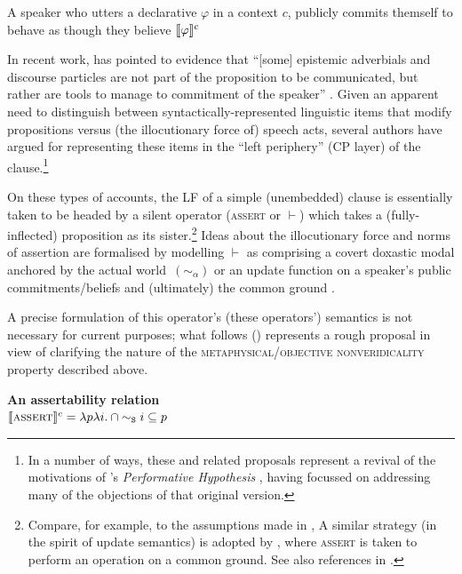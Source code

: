A speaker who utters a declarative $ \varphi $ in a context $ c $, publicly commits themself to behave as though they believe $ \denote[c]{\varphi} $ 
\xe





In recent work, \citeauthor{Krifka2019} has pointed to evidence that ``[some] epistemic adverbials and discourse particles are not part of the proposition to be communicated, but rather are tools to manage to commitment of the speaker'' \citeyearpar[84]{Krifka2019}. Given an apparent need to distinguish between syntactically-represented linguistic items that modify propositions versus (the illocutionary force of) speech acts, several authors have argued for representing these items in the ``left periphery'' (CP layer) of the clause.\footnote{In a number of ways, these and related proposals represent a revival of the motivations of \citeauthor{Ross1970}'s \textit{Performative Hypothesis} \citeyearpar{Ross1970}, having focussed on addressing many of the objections of that original version.} 







On these types of accounts, the LF of a simple (unembedded) clause is essentially taken to be headed by a silent operator (\textsc{assert} or $ \vdash $) which takes a (fully-inflected) proposition as its sister.\footnote{Compare, for example, to the assumptions made in \citealt{Hacquard2010,AlonsoBenito2015,Kaufmann2005}, A similar strategy (in the spirit of update semantics) is adopted by \citet[570]{Krifka2016}, where \textsc{assert} is taken to perform an operation on a common ground. See also references in \citet[102]{Hacquard2010}.} 
Ideas about the illocutionary force and norms of assertion are formalised by modelling $ \vdash $ as comprising a covert doxastic modal anchored by the actual world\ $( \sim_\alpha) $ \citep{Kaufmann2005} or an update function on a speaker's public commitments/beliefs and (ultimately) the common ground \citep{Krifka2015,Lauer2013}.

A precise formulation of this operator's (these operators') semantics is not necessary for current purposes; what follows (\nextx) represents a rough proposal in view of clarifying the nature of the \textsc{metaphysical/objective nonveridicality} property described above.
	
	\pex \textbf{An assertability relation}\\
	$ \denote[c]{\textsc{assert}}%
	=\lambda p\lambda i.\cap{\sim_{\mathtt{S}} i} \subseteq p$
	
